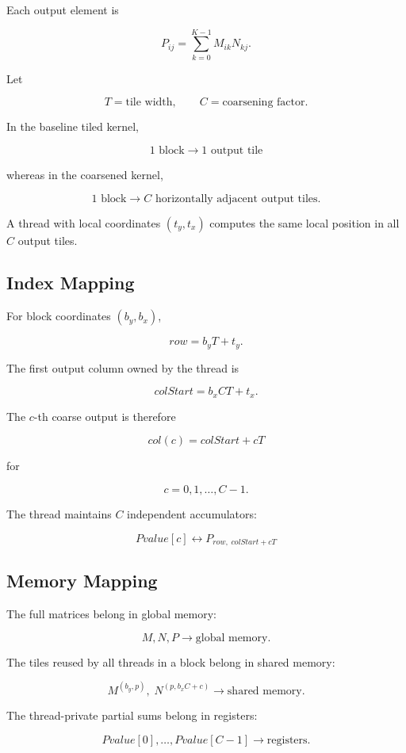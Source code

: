 \documentclass[11pt]{article}
\begin{document}
Each output element is

\[
P_{ij}
=
\sum_{k=0}^{K-1}
M_{ik}N_{kj}.
\]

Let

\[
T=\text{tile width},
\qquad
C=\text{coarsening factor}.
\]

In the baseline tiled kernel,

\[
\boxed{
1\text{ block}
\rightarrow
1\text{ output tile}
}
\]

whereas in the coarsened kernel,

\[
\boxed{
1\text{ block}
\rightarrow
C\text{ horizontally adjacent output tiles}.
}
\]

A thread with local coordinates \((t_y,t_x)\) computes the same local position in all \(C\) output tiles.

\subsection{Index Mapping}

For block coordinates \((b_y,b_x)\),

\[
row=b_yT+t_y.
\]

The first output column owned by the thread is

\[
colStart=b_xCT+t_x.
\]

The \(c\)-th coarse output is therefore

\[
\boxed{
col(c)=colStart+cT
}
\]

for

\[
c=0,1,\ldots,C-1.
\]

The thread maintains \(C\) independent accumulators:

\[
\boxed{
Pvalue[c]
\leftrightarrow
P_{row,\;colStart+cT}
}
\]

\subsection{Memory Mapping}

The full matrices belong in global memory:

\[
M,N,P \rightarrow \text{global memory}.
\]

The tiles reused by all threads in a block belong in shared memory:

\[
M^{(b_y,p)},\;
N^{(p,b_xC+c)}
\rightarrow
\text{shared memory}.
\]

The thread-private partial sums belong in registers:

\[
Pvalue[0],\ldots,Pvalue[C-1]
\rightarrow
\text{registers}.
\]
\end{document}
